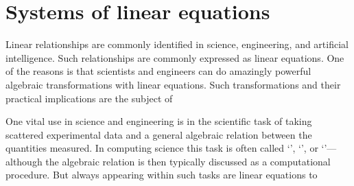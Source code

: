 
\chapter{Systems of linear equations}
\label{ch:sle}

\minitoc
{}


Linear relationships are commonly identified in science, engineering, and artificial intelligence.
Such relationships are commonly expressed as linear equations.
One of the reasons is that scientists and engineers can do amazingly powerful algebraic transformations with linear equations.
Such transformations and their practical implications are the subject of 

One vital use in science and engineering is in the scientific task of taking scattered experimental data and  a general algebraic relation between the quantities measured.
In computing science this task is often called `', `', or `'---although  the algebraic relation is then typically discussed as a computational procedure.
But always appearing within such tasks are linear equations to 

